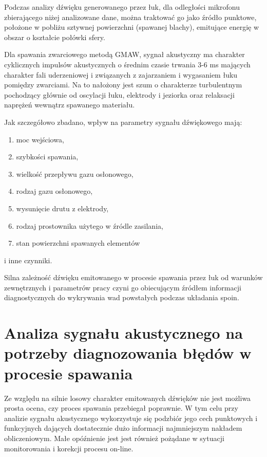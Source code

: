\documentclass{mwart}
\begin{document}
Podczas analizy dźwięku generowanego przez łuk, dla odległości mikrofonu zbierającego niżej analizowane dane, można traktować go jako źródło punktowe, położone w pobliżu sztywnej powierzchni (spawanej blachy), emitujące energię w obszar o kształcie połówki sfery\cite{arata_investigation_1979}.

Dla spawania zwarciowego metodą GMAW, sygnał akustyczny ma charakter cyklicznych impulsów akustycznych  \cite{arata_investigation_1979, horvat_monitoring_2011} o średnim czasie trwania 3-6 ms\cite{luksa_przydatnosc_2012} mających charakter fali uderzeniowej \cite{arata_investigation_1979} i związanych z zajarzaniem i wygasaniem łuku pomiędzy zwarciami. Na to nałożony jest szum o charakterze turbulentnym pochodzący głównie od oscylacji łuku, elektrody i jeziorka oraz relaksacji naprężeń wewnątrz spawanego materiału\cite{horvat_monitoring_2011}.


Jak szczegółowo zbadano, wpływ na parametry sygnału dźwiękowego mają: 
\begin{enumerate}
\item moc wejściowa\cite{arata_investigation_1979, luksa_przydatnosc_2012},
\item szybkości spawania\cite{arata_investigation_1979},
\item wielkość przepływu gazu osłonowego\cite{arata_investigation_1979},
\item rodzaj gazu osłonowego\cite{arata_investigation_1979, luksa_przydatnosc_2012},
\item wysunięcie drutu z elektrody\cite{arata_investigation_1979},
\item rodzaj prostownika użytego w źródle zasilania\cite{luksa_przydatnosc_2012},
\item stan powierzchni spawanych elementów
\end{enumerate}
i inne czynniki.

Silna zależność dźwięku emitowanego w procesie spawania przez łuk od warunków zewnętrznych i parametrów pracy czyni go obiecującym źródłem informacji diagnostycznych do wykrywania wad powstałych podczas układania spoin.


\section{Analiza sygnału akustycznego na potrzeby diagnozowania błędów w procesie spawania}

Ze względu na silnie losowy charakter emitowanych dźwięków nie jest możliwa prosta ocena, czy proces spawania przebiegał poprawnie. W tym celu przy analizie sygnału akustycznego wykorzystuje się podzbiór jego cech punktowych i funkcyjnych dających dostatecznie dużo informacji najmniejszym nakładem obliczeniowym. Małe opóźnienie jest jest również pożądane w sytuacji monitorowania i korekcji procesu on-line.
\end{document}
